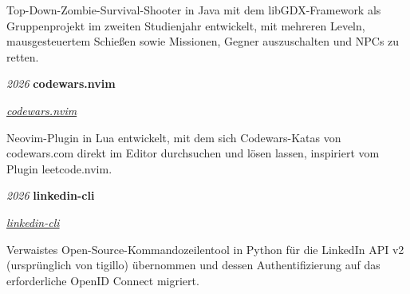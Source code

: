 \documentclass[german]{cv}
\begin{document}
        \vspace{0.10 cm}
        \begin{onecolentry}
            \begin{highlights}
                \item Top-Down-Zombie-Survival-Shooter in Java mit dem libGDX-Framework als Gruppenprojekt im zweiten Studienjahr entwickelt, mit mehreren Leveln, mausgesteuertem Schießen sowie Missionen, Gegner auszuschalten und NPCs zu retten.
            \end{highlights}
        \end{onecolentry}

        \vspace{0.13 cm}

        \begin{twocolentry}{
        \textit{2026}}
            \textbf{codewars.nvim}

            \textit{\href{https://github.com/prosk-sudo/codewars.nvim}{codewars.nvim}}
        \end{twocolentry}

        \vspace{0.10 cm}
        \begin{onecolentry}
            \begin{highlights}
                \item Neovim-Plugin in Lua entwickelt, mit dem sich Codewars-Katas von codewars.com direkt im Editor durchsuchen und lösen lassen, inspiriert vom Plugin leetcode.nvim.
            \end{highlights}
        \end{onecolentry}

        \vspace{0.13 cm}

        \begin{twocolentry}{
        \textit{2026}}
            \textbf{linkedin-cli}

            \textit{\href{https://github.com/prosk-sudo/linkedin-cli}{linkedin-cli}}
        \end{twocolentry}

        \vspace{0.10 cm}
        \begin{onecolentry}
            \begin{highlights}
                \item Verwaistes Open-Source-Kommandozeilentool in Python für die LinkedIn API v2 (ursprünglich von tigillo) übernommen und dessen Authentifizierung auf das erforderliche OpenID Connect migriert.
            \end{highlights}
        \end{onecolentry}
\end{document}
